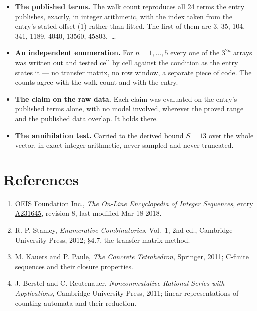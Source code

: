 \documentclass[11pt]{article}
\theoremstyle{definition}
\begin{document}
\begin{itemize}

\item {\bfseries The published terms.} The walk count reproduces all 24 terms the entry publishes, exactly, in integer arithmetic, with the index taken from the entry's stated offset (1) rather than fitted. The first of them are 3, 35, 104, 341, 1189, 4040, 13560, 45803,~\dots

\item {\bfseries An independent enumeration.} For $n = 1,\dots,5$ every one of the $3^{2n}$ arrays was written out and tested cell by cell against the condition as the entry states it --- no transfer matrix, no row window, a separate piece of code. The counts agree with the walk count and with the entry.

\item {\bfseries The claim on the raw data.} Each claim was evaluated on the entry's published terms alone, with no model involved, wherever the proved range and the published data overlap. It holds there.

\item {\bfseries The annihilation test.} Carried to the derived bound $S = 13$ over the whole vector, in exact integer arithmetic, never sampled and never truncated.

\end{itemize}

\section{References}

\begin{enumerate}

\item OEIS Foundation Inc., \emph{The On-Line Encyclopedia of Integer Sequences}, entry \href{https://oeis.org/A231645}{A231645}, revision 8, last modified Mar 18 2018.

\item R. P. Stanley, \emph{Enumerative Combinatorics}, Vol.~1, 2nd ed., Cambridge University Press, 2012; \S4.7, the transfer-matrix method.

\item M. Kauers and P. Paule, \emph{The Concrete Tetrahedron}, Springer, 2011; C-finite sequences and their closure properties.

\item J. Berstel and C. Reutenauer, \emph{Noncommutative Rational Series with Applications}, Cambridge University Press, 2011; linear representations of counting automata and their reduction.

\end{enumerate}
\end{document}
